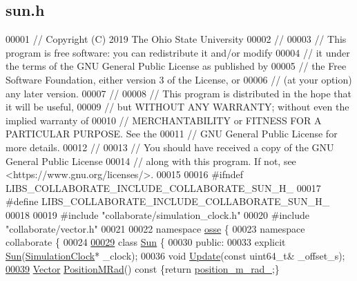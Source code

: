 \hypertarget{sun_8h_source}{}\subsection{sun.\+h}
\label{sun_8h_source}

\begin{DoxyCode}
00001 \textcolor{comment}{// Copyright (C) 2019 The Ohio State University}
00002 \textcolor{comment}{//}
00003 \textcolor{comment}{// This program is free software: you can redistribute it and/or modify}
00004 \textcolor{comment}{// it under the terms of the GNU General Public License as published by}
00005 \textcolor{comment}{// the Free Software Foundation, either version 3 of the License, or}
00006 \textcolor{comment}{// (at your option) any later version.}
00007 \textcolor{comment}{//}
00008 \textcolor{comment}{// This program is distributed in the hope that it will be useful,}
00009 \textcolor{comment}{// but WITHOUT ANY WARRANTY; without even the implied warranty of}
00010 \textcolor{comment}{// MERCHANTABILITY or FITNESS FOR A PARTICULAR PURPOSE.  See the}
00011 \textcolor{comment}{// GNU General Public License for more details.}
00012 \textcolor{comment}{//}
00013 \textcolor{comment}{// You should have received a copy of the GNU General Public License}
00014 \textcolor{comment}{// along with this program.  If not, see <https://www.gnu.org/licenses/>.}
00015 
00016 \textcolor{preprocessor}{#ifndef LIBS\_COLLABORATE\_INCLUDE\_COLLABORATE\_SUN\_H\_}
00017 \textcolor{preprocessor}{#define LIBS\_COLLABORATE\_INCLUDE\_COLLABORATE\_SUN\_H\_}
00018 
00019 \textcolor{preprocessor}{#include "collaborate/simulation\_clock.h"}
00020 \textcolor{preprocessor}{#include "collaborate/vector.h"}
00021 
00022 \textcolor{keyword}{namespace }\hyperlink{namespaceosse}{osse} \{
00023 \textcolor{keyword}{namespace }collaborate \{
00024 
\hyperlink{classosse_1_1collaborate_1_1_sun}{00029} \textcolor{keyword}{class }\hyperlink{classosse_1_1collaborate_1_1_sun}{Sun} \{
00030  \textcolor{keyword}{public}:
00033   \textcolor{keyword}{explicit} \hyperlink{classosse_1_1collaborate_1_1_sun_a0fee2016c313072585008c22361d5e64}{Sun}(\hyperlink{classosse_1_1collaborate_1_1_simulation_clock}{SimulationClock}* \_clock);
00036   \textcolor{keywordtype}{void} \hyperlink{classosse_1_1collaborate_1_1_sun_a917e9e3cce61142249bb53157a299b09}{Update}(\textcolor{keyword}{const} uint64\_t& \_offset\_s);
\hyperlink{classosse_1_1collaborate_1_1_sun_aa1daaa3502398464ce590981c9c9764e}{00039}   \hyperlink{classosse_1_1collaborate_1_1_vector}{Vector} \hyperlink{classosse_1_1collaborate_1_1_sun_aa1daaa3502398464ce590981c9c9764e}{PositionMRad}()\textcolor{keyword}{ const }\{\textcolor{keywordflow}{return} \hyperlink{classosse_1_1collaborate_1_1_sun_aea321687f39a904c3b35b60058a60b5b}{position\_m\_rad\_};\}

\end{DoxyCode}
